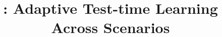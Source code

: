 \documentclass{article}
\title{\method: Adaptive Test-time Learning Across Scenarios}
\begin{document}
\maketitle






\FloatBarrier

\FloatBarrier




\clearpage
\appendix


\clearpage

\end{document}

